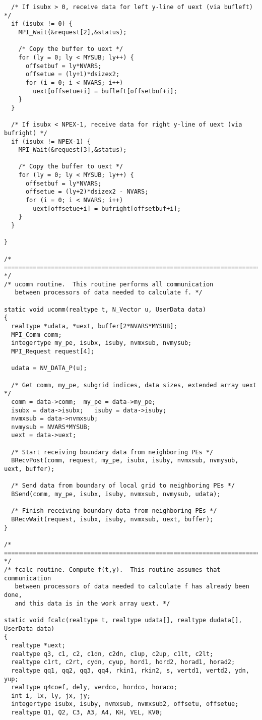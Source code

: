 \begin{verbatim}
  /* If isubx > 0, receive data for left y-line of uext (via bufleft) */
  if (isubx != 0) {
    MPI_Wait(&request[2],&status);

    /* Copy the buffer to uext */
    for (ly = 0; ly < MYSUB; ly++) {
      offsetbuf = ly*NVARS;
      offsetue = (ly+1)*dsizex2;
      for (i = 0; i < NVARS; i++)
        uext[offsetue+i] = bufleft[offsetbuf+i];
    }
  }

  /* If isubx < NPEX-1, receive data for right y-line of uext (via bufright) */
  if (isubx != NPEX-1) {
    MPI_Wait(&request[3],&status);

    /* Copy the buffer to uext */
    for (ly = 0; ly < MYSUB; ly++) {
      offsetbuf = ly*NVARS;
      offsetue = (ly+2)*dsizex2 - NVARS;
      for (i = 0; i < NVARS; i++)
        uext[offsetue+i] = bufright[offsetbuf+i];
    }
  }

}

/* ======================================================================= */
/* ucomm routine.  This routine performs all communication 
   between processors of data needed to calculate f. */

static void ucomm(realtype t, N_Vector u, UserData data)
{
  realtype *udata, *uext, buffer[2*NVARS*MYSUB];
  MPI_Comm comm;
  integertype my_pe, isubx, isuby, nvmxsub, nvmysub;
  MPI_Request request[4];

  udata = NV_DATA_P(u);

  /* Get comm, my_pe, subgrid indices, data sizes, extended array uext */
  comm = data->comm;  my_pe = data->my_pe;
  isubx = data->isubx;   isuby = data->isuby;
  nvmxsub = data->nvmxsub;
  nvmysub = NVARS*MYSUB;
  uext = data->uext;

  /* Start receiving boundary data from neighboring PEs */
  BRecvPost(comm, request, my_pe, isubx, isuby, nvmxsub, nvmysub, uext, buffer);

  /* Send data from boundary of local grid to neighboring PEs */
  BSend(comm, my_pe, isubx, isuby, nvmxsub, nvmysub, udata);

  /* Finish receiving boundary data from neighboring PEs */
  BRecvWait(request, isubx, isuby, nvmxsub, uext, buffer);
}

/* ======================================================================= */
/* fcalc routine. Compute f(t,y).  This routine assumes that communication 
   between processors of data needed to calculate f has already been done,
   and this data is in the work array uext. */

static void fcalc(realtype t, realtype udata[], realtype dudata[], UserData data)
{
  realtype *uext;
  realtype q3, c1, c2, c1dn, c2dn, c1up, c2up, c1lt, c2lt;
  realtype c1rt, c2rt, cydn, cyup, hord1, hord2, horad1, horad2;
  realtype qq1, qq2, qq3, qq4, rkin1, rkin2, s, vertd1, vertd2, ydn, yup;
  realtype q4coef, dely, verdco, hordco, horaco;
  int i, lx, ly, jx, jy;
  integertype isubx, isuby, nvmxsub, nvmxsub2, offsetu, offsetue;
  realtype Q1, Q2, C3, A3, A4, KH, VEL, KV0;


\end{verbatim}
